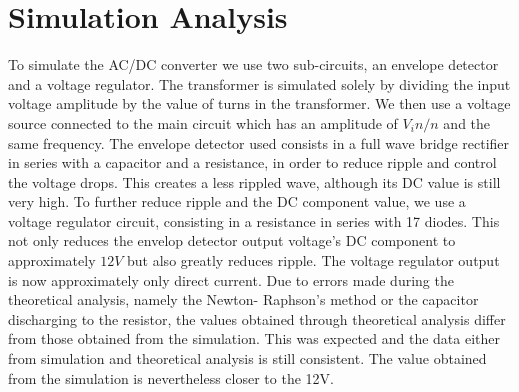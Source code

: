 \section{Simulation Analysis}
\label{sec:simulation}

To simulate the AC/DC converter we use two sub-circuits, an envelope detector and a voltage regulator.
The transformer is simulated solely by dividing the input voltage amplitude by the value of turns in the transformer. We then use a voltage source connected to the main circuit which has an amplitude of $V_in/n$ and the same frequency.
The envelope detector used consists in a full wave bridge rectifier in series with a capacitor and a resistance, in order to reduce ripple and control the voltage drops. This creates a less rippled wave, although its DC value is still very high.
To further reduce ripple and the DC component value, we use a voltage regulator circuit, consisting in a resistance in series with 17 diodes.
This not only reduces the envelop detector output voltage's DC component to approximately $12V$ but also greatly reduces ripple.
The voltage regulator output is now approximately only direct current.
Due to errors made during the theoretical analysis, namely the Newton- Raphson's method or the capacitor discharging to the resistor, the values obtained through theoretical analysis differ from those obtained from the simulation. This was expected and the data either from simulation and theoretical analysis is still consistent. The value obtained from the simulation is nevertheless closer to the 12V.
